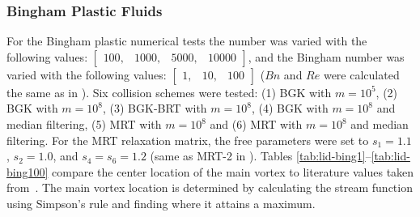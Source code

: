 \subsubsection{Bingham Plastic Fluids}

For the Bingham plastic numerical tests the \DIFdelbegin {}\DIFdelend \DIFaddbegin {}\DIFaddend number was varied with the following values: $\begin{bmatrix}100,&1000,&5000,&10000\end{bmatrix}$, and the Bingham number was varied with the following values: $\begin{bmatrix}1,&10,&100\end{bmatrix}$ ($Bn$ and $Re$ were calculated the same as in ).
Six collision schemes were tested: (1) BGK with $m = 10^5$, (2) BGK with $m = 10^8$, (3) BGK-BRT with $m = 10^8$, (4) BGK with $m = 10^8$ and median filtering, (5) MRT with $m = 10^8$ and (6) MRT with $m = 10^8$ and median filtering.
For the MRT relaxation matrix, the free parameters were set to $s_1 = 1.1$, $s_2 = 1.0$, and $s_4 = s_6 = 1.2$ (same as MRT-2 in ).
Tables \ref{tab:lid-bing1}--\ref{tab:lid-bing100} compare the center location of the main vortex to literature values taken from~\citet{syrakos2014performance}.
The main vortex location is determined by calculating the stream function using Simpson's rule and finding where it attains a maximum.

